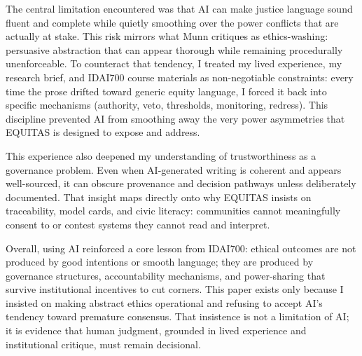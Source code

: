 \documentclass[12pt,letterpaper]{article}
\begin{document}
The central limitation encountered was that AI can make justice language sound fluent and complete while quietly smoothing over the power conflicts that are actually at stake. This risk mirrors what Munn critiques as ethics-washing: persuasive abstraction that can appear thorough while remaining procedurally unenforceable.\cite{munn_idai700} To counteract that tendency, I treated my lived experience, my research brief, and IDAI700 course materials as non-negotiable constraints: every time the prose drifted toward generic equity language, I forced it back into specific mechanisms (authority, veto, thresholds, monitoring, redress). This discipline prevented AI from smoothing away the very power asymmetries that EQUITAS is designed to expose and address.\cite{garcia_ed415}

This experience also deepened my understanding of trustworthiness as a governance problem. Even when AI-generated writing is coherent and appears well-sourced, it can obscure provenance and decision pathways unless deliberately documented. That insight maps directly onto why EQUITAS insists on traceability, model cards, and civic literacy: communities cannot meaningfully consent to or contest systems they cannot read and interpret.\cite{sagona2025}

Overall, using AI reinforced a core lesson from IDAI700: ethical outcomes are not produced by good intentions or smooth language; they are produced by governance structures, accountability mechanisms, and power-sharing that survive institutional incentives to cut corners.\cite{munn_idai700} This paper exists only because I insisted on making abstract ethics operational and refusing to accept AI's tendency toward premature consensus. That insistence is not a limitation of AI; it is evidence that human judgment, grounded in lived experience and institutional critique, must remain decisional.\cite{garcia_ed415}
\end{document}
